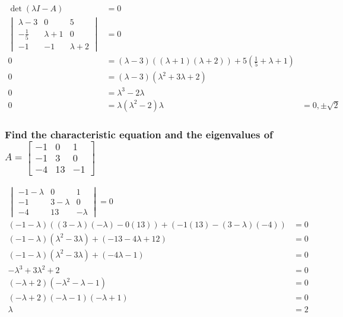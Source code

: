 \documentclass[
  letterpaper,
  DIV=11,
  numbers=noendperiod]{scrartcl}
\begin{document}
\begin{align*}
\det(\lambda I - A) &= 0 \\
\begin{vmatrix}\lambda-3 & 0 & 5 \\ -\frac{1}{5} & \lambda+1 & 0 \\ -1 & -1 & \lambda+2 \end{vmatrix} &= 0 \\
0 &= (\lambda-3)((\lambda+1)(\lambda+2))+5(\frac{1}{5} + \lambda+1) \\
0 &= (\lambda-3)(\lambda^2+3\lambda+2) \\
0 &= \lambda^3-2\lambda \\
0 &= \lambda(\lambda^2-2)
\lambda &= 0, \pm\sqrt{2}
\end{align*}

\subsubsection{\texorpdfstring{Find the characteristic equation and the
eigenvalues of
\(A = \begin{bmatrix}-1 & 0 & 1 \\ -1 & 3 & 0 \\ -4 & 13 & -1 \end{bmatrix}\)}{Find the characteristic equation and the eigenvalues of A = \textbackslash begin\{bmatrix\}-1 \& 0 \& 1 \textbackslash\textbackslash{} -1 \& 3 \& 0 \textbackslash\textbackslash{} -4 \& 13 \& -1 \textbackslash end\{bmatrix\}}}\label{find-the-characteristic-equation-and-the-eigenvalues-of-a-beginbmatrix-1-0-1--1-3-0--4-13--1-endbmatrix}

\begin{align*}
\begin{vmatrix}-1-\lambda & 0 & 1 \\ -1 & 3-\lambda & 0 \\ -4 & 13 & -\lambda \end{vmatrix} = 0 \\
(-1-\lambda) \left((3-\lambda)(-\lambda)-0(13)\right)+\left(-1(13)-(3-\lambda)(-4)\right) &= 0 \\
(-1-\lambda)(\lambda^2-3\lambda)+(-13-4\lambda+12) &= 0 \\
(-1-\lambda)(\lambda^2-3\lambda)+(-4\lambda-1) &= 0 \\
-\lambda^3+3\lambda^2+2 &= 0 \\
(-\lambda+2)(-\lambda^2-\lambda-1) &= 0 \\
(-\lambda+2)(-\lambda-1)(-\lambda+1) &= 0 \\
\lambda &= 2
\end{align*}
\end{document}
